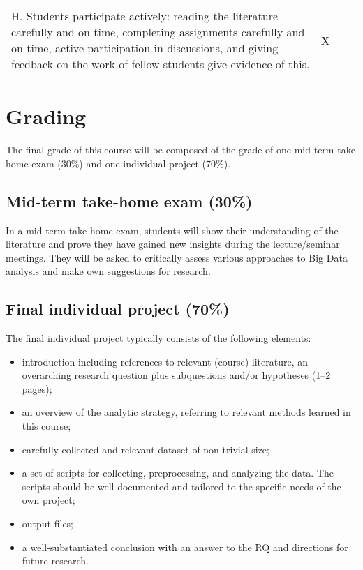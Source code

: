 \documentclass[a4paper,12pt]{report}
\begin{document}
\begin{table}[]
{\begin{tabular}{p{8cm}p{2cm}p{2cm}p{2cm}}
H. Students participate actively: reading the literature carefully and on time, completing assignments carefully and on time, active participation in discussions, and giving feedback on the work of fellow students give evidence of this.                                                                                                                                      & X                                                                                            &                         &                         
\end{tabular}
}
\end{table}




\section*{Grading}

The final grade of this course will be composed of the grade of one mid-term take home exam (30\%) and one individual project (70\%).

\subsection*{Mid-term take-home exam (30\%)}
In a mid-term take-home exam, students will show their understanding of the literature and prove they have gained new insights during the lecture/seminar meetings. They will be asked to critically assess various approaches to Big Data analysis and make own suggestions for research.

\subsection*{Final individual project (70\%)}
The final individual project typically consists of the following elements:
\begin{itemize}
\item introduction including references to relevant (course) literature, an overarching research question plus subquestions and/or hypotheses (1–2 pages);
\item an overview of the analytic strategy, referring to relevant methods learned in this course;
\item carefully collected and relevant dataset of non-trivial size;
\item a set of scripts for collecting, preprocessing, and analyzing the data. The scripts should be well-documented and tailored to the specific needs of the own project;
\item output files;
\item a well-substantiated conclusion with an answer to the RQ and directions for future research.
\end{itemize}
\end{document}
